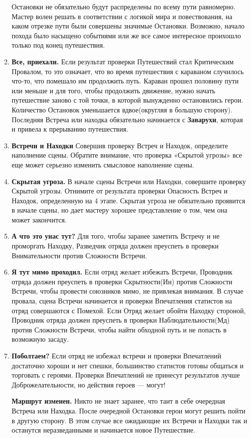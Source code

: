 \begin{enumerate}
\begin{tcolorbox}
Остановки не обязательно будут распределены по всему пути равномерно. Мастер волен решать в соответствии с логикой мира и повествования, на каком отрезке пути были совершены значимые Остановки. Возможно, начало похода было насыщено событиями или же все самое интересное проихошло только под конец путешествия.
\end{tcolorbox}
\item \textbf{Все, приехали.} Если результат проверки Путешествий стал Критическим Провалом, то это означает, что во время путешествия с караваном случилось что-то, что помешало им продолжить путь. Караван прошел половину пути или меньше и для того, чтобы продолжить движение, нужно начать путешествие заново с той точки, в которой вынужденно остановились герои.
\newline Количество Остановок уменьшается вдвое(округляя в большую сторону). Последняя Встреча или находка обязательно начинается с \textbf{Заварухи}, которая и привела к прерыванию путешествия.

\item \textbf{Встречи и Находки} Совершив проверку Встреч и Находок, определите наполнение сцены. Обратите внимание, что проверка «Скрытой угрозы» все еще может серьезно изменить смысловое наполнение сцены.
\item \textbf{Скрытая угроза.} В начале сцены Встречи или Находки, совершите проверку Скрытой угрозы. Отнимите от результата проверки Опасность Встреч и Находок, определенную на 4 этапе. Скрытая угроза не обязательно проявится в начале сцены, но дает мастеру хорошее представление о том, чем она может закончится.
\item \textbf{А что это унас тут?} Для того, чтобы заранее заметить Встречу и не проморгать Находку, Разведчик отряда должен преуспеть в проверки Внимательности против Сложности Встречи.
\item \textbf{Я тут мимо проходил.} Если отряд желает избежать Встречи, Проводник отряда должен преуспеть в проверки Скрытности(Ин) против Сложности Встречи, чтобы провести союзников мимо, не привлекая внимания. В случае провала, сцена Встречи начинается и проверки Впечатления статистов на отряд совершаются с Помехой.
\newline
Если Отряд желает обойти Находку стороной, Проводник отряда должен преуспеть в проверки Наблюдательности(Мд) против Сложности Встречи, чтобы найти обходной путь и не попасть в возможную засаду.
\item \textbf{Поболтаем?} Если отряд не избежал встречи и проверки Впечатлений достаточно хороши и нет спешки, большинство статистов готовы общаться и торговать с героями. Проверки Впечатлений не принесут результатов лучше Доброжелательности, но действия героев — могут!
\begin{tcolorbox}
\textbf{Маршрут изменен.} Никто не знает заранее, что таит в себе очередная Встреча или Находка. После очередной Остановки герои могут решить пойти в другую сторону. В этом случае все ожидающие их Встречи и Находки так и останутся неразведанными и начинается новое Путешествие.
\end{tcolorbox}
\end{enumerate}
